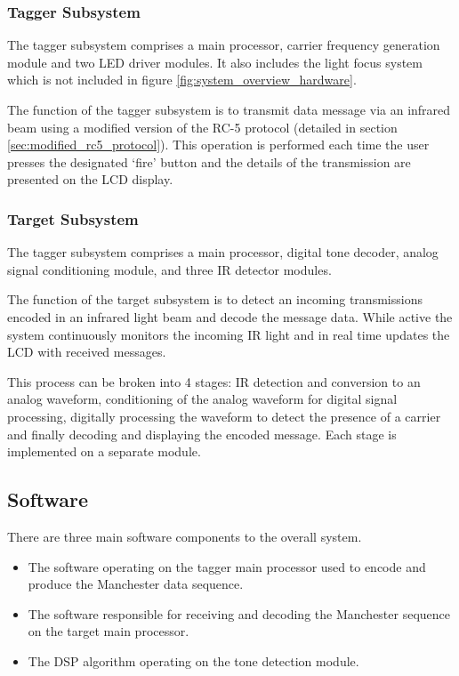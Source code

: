 \subsubsection{Tagger Subsystem}

The tagger subsystem comprises a main processor, carrier frequency generation module and two LED driver modules. It also includes the light focus system which is not included in figure \ref{fig:system_overview_hardware}.

The function of the tagger subsystem is to transmit data message via an infrared beam using a modified version of the RC-5 protocol (detailed in section \ref{sec:modified_rc5_protocol}). This operation is performed each time the user presses the designated `fire' button and the details of the transmission are presented on the LCD display.


\subsubsection{Target Subsystem}

The tagger subsystem comprises a main processor, digital tone decoder, analog signal conditioning module, and three IR detector modules.

The function of the target subsystem is to detect an incoming transmissions encoded in an infrared light beam and decode the message data. While active the system continuously monitors the incoming IR light and in real time updates the LCD with received messages.

This process can be broken into 4 stages: IR detection and conversion to an analog waveform, conditioning of the analog waveform for digital signal processing, digitally processing the waveform to detect the presence of a carrier and finally decoding and displaying the encoded message. Each stage is implemented on a separate module.

\subsection{Software}

There are three main software components to the overall system.
\begin{itemize}
	\item The software operating on the tagger main processor used to encode and produce the Manchester data sequence.
	\item The software responsible for receiving and decoding the Manchester sequence on the target main processor.
	\item  The DSP algorithm operating on the tone detection module.
\end{itemize}






